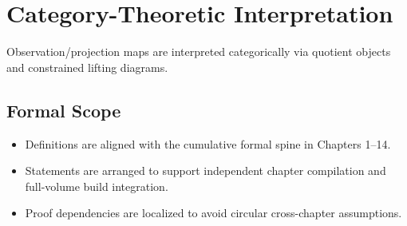 \documentclass[../../clio.tex]{subfiles}
\begin{document}
\chapter{Category-Theoretic Interpretation}
\label{apx:f-category-theory}

Observation/projection maps are interpreted categorically via quotient objects and constrained lifting diagrams.

\section{Formal Scope}
\begin{itemize}
  \item Definitions are aligned with the cumulative formal spine in Chapters 1--14.
  \item Statements are arranged to support independent chapter compilation and full-volume build integration.
  \item Proof dependencies are localized to avoid circular cross-chapter assumptions.
\end{itemize}
\end{document}
